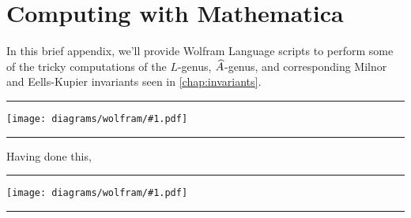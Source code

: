 \newcommand{\wolfram}[1]{
  \noindent
  \begin{center}\rule{\textwidth}{1.2pt}\end{center}
  \texttt{[image: diagrams/wolfram/\#1.pdf]}
  \vspace{-1em}
  \begin{center}\rule{\textwidth}{1.2pt}\end{center}
}

\chapter{Computing with Mathematica}\label{chap:wolfram}

In this brief appendix, we'll provide Wolfram Language scripts to perform some of the tricky computations of the $L$-genus, $\widehat{A}$-genus, and corresponding Milnor and Eells-Kupier invariants seen in \cref{chap:invariants}.

\wolfram{multseq}

Having done this,

\wolfram{characteristic}
